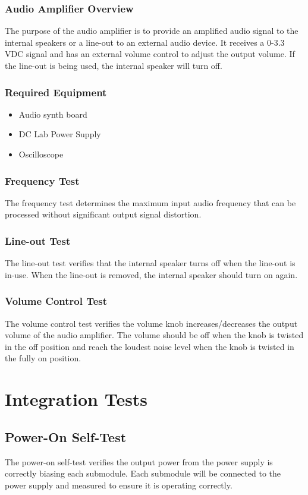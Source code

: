\documentclass{article}
\begin{document}
\subsubsection{Audio Amplifier Overview}
The purpose of the audio amplifier is to provide an amplified audio signal to the internal speakers or a line-out to an external audio device.  It receives a 0-3.3 VDC signal and has an external volume control to adjust the output volume.  If the line-out is being used, the internal speaker will turn off.
\subsubsection{Required Equipment}
\begin{itemize}
\item Audio synth board
\item DC Lab Power Supply
\item Oscilloscope
\end{itemize}
\subsubsection{Frequency Test}
The frequency test determines the maximum input audio frequency that can be processed without significant output signal distortion.
\subsubsection{Line-out Test}
The line-out test verifies that the internal speaker turns off when the line-out is in-use.  When the line-out is removed, the internal speaker should turn on again.
\subsubsection{Volume Control Test}
The volume control test verifies the volume knob increases/decreases the output volume of the audio amplifier.  The volume should be off when the knob is twisted in the off position and reach the loudest noise level when the knob is twisted in the fully on position.

\section{Integration Tests}

\subsection{Power-On Self-Test}
The power-on self-test verifies the output power from the power supply is correctly biasing each submodule.  Each submodule will be connected to the power supply and measured to ensure it is operating correctly.
\end{document}

